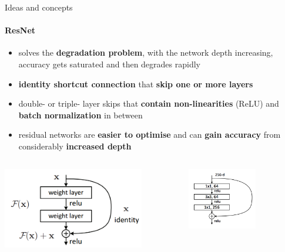 \documentclass[aspectratio=169, professionalfonts]{beamer}
\begin{document}
\begin{frame}{Ideas and concepts}
    \framesubtitle{ResNet}
    \begin{itemize}
        \item solves the \textbf{degradation problem}, with the network depth increasing, accuracy gets saturated and then degrades rapidly
        \item \textbf{identity shortcut connection} that \textbf{skip one or more layers}
        \item double- or triple- layer skips that \textbf{contain non-linearities} (ReLU) and \textbf{batch normalization} in between
        \item residual networks are \textbf{easier to optimise} and can \textbf{gain accuracy} from considerably \textbf{increased depth}
    \end{itemize}
	\begin{columns}
        \centering
        \includegraphics[width=0.8\textwidth,keepaspectratio]{images/ResNet_SkipConnections.png}
    
        \centering
        \includegraphics[width=0.6\textwidth,keepaspectratio]{images/ResNet_Stacks.png}
    \end{columns}
\end{frame}
\end{document}
